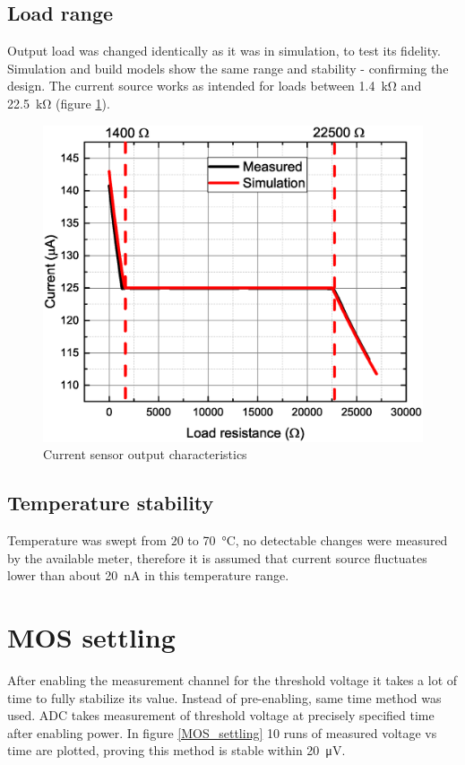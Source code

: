     \subsection{Load range}
        Output load was changed identically as it was in simulation, to test its fidelity. Simulation and build models show the same range and stability - confirming the design. The current source works as intended for loads between \SI{1.4}{\kilo\ohm} and \SI{22.5}{\kilo\ohm} (figure \ref{Current_sensor_output_characteristics}).
        \begin{figure}[H]
            \centering
            \includegraphics[width=0.9\paperwidth]{img/07/output_resistance.eps}
            \caption{Current sensor output characteristics}
            \label{Current_sensor_output_characteristics}
        \end{figure}

    \subsection{Temperature stability}
        Temperature was swept from $20$ to \SI{70}{\degreeCelsius}, no detectable changes were measured by the available meter, therefore it is assumed that current source fluctuates lower than about \SI{20}{\nano\ampere} in this temperature range.

\section{MOS settling}
    After enabling the measurement channel for the threshold voltage it takes a lot of time to fully stabilize its value. Instead of pre-enabling, same time method was used. ADC takes measurement of threshold voltage at precisely specified time after enabling power. In figure \ref{MOS_settling} 10 runs of measured voltage vs time are plotted, proving this method is stable within \SI{20}{\uV}.

